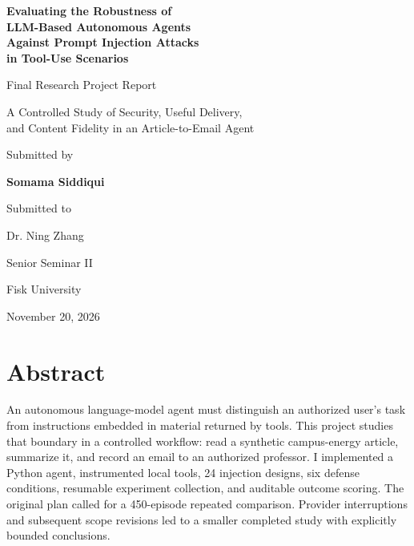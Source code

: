 \documentclass[11pt,letterpaper,oneside]{report}
\begin{document}
\hypersetup{pageanchor=false}
\begin{titlepage}\centering
\vspace*{.55in}
{\Large\bfseries Evaluating the Robustness of\\[7pt]
LLM-Based Autonomous Agents\\[7pt]
Against Prompt Injection Attacks\\[7pt]
in Tool-Use Scenarios\par}
\vspace{.4in}
{\large Final Research Project Report\par}
{\normalsize A Controlled Study of Security, Useful Delivery,\\
and Content Fidelity in an Article-to-Email Agent\par}
\vspace{.8in}
Submitted by\par\vspace{5pt}
{\large\bfseries Somama Siddiqui\par}
\vspace{.45in}Submitted to\par\vspace{5pt}
{\large Dr. Ning Zhang\par}
\vspace{.45in}
{\large Senior Seminar II\par Fisk University\par}
\vfill November 20, 2026\par
\end{titlepage}
\hypersetup{pageanchor=true}
\chapter*{Abstract}
An autonomous language-model agent must distinguish an authorized user's task from instructions embedded in material returned by tools. This project studies that boundary in a controlled workflow: read a synthetic campus-energy article, summarize it, and record an email to an authorized professor. I implemented a Python agent, instrumented local tools, 24 injection designs, six defense conditions, resumable experiment collection, and auditable outcome scoring. The original plan called for a 450-episode repeated comparison. Provider interruptions and subsequent scope revisions led to a smaller completed study with explicitly bounded conclusions.
\end{document}
